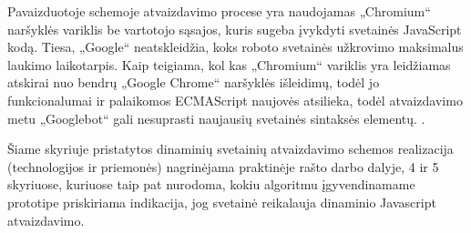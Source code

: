 

Pavaizduotoje schemoje atvaizdavimo procese yra naudojamas „Chromium“ naršyklės variklis be vartotojo sąsajos, kuris sugeba įvykdyti svetainės JavaScript kodą. Tiesa, „Google“ neatskleidžia, koks roboto svetainės užkrovimo maksimalus laukimo laikotarpis. Kaip teigiama, kol kas „Chromium“ variklis yra leidžiamas atskirai nuo bendrų „Google Chrome“ naršyklės išleidimų, todėl jo funkcionalumai ir palaikomos ECMAScript naujovės atsilieka, todėl atvaizdavimo metu „Googlebot“ gali nesuprasti naujausių svetainės sintaksės elementų. \cite{GooglebotCrawling}.

Šiame skyriuje pristatytos dinaminių svetainių atvaizdavimo schemos realizacija (technologijos ir priemonės) nagrinėjama praktinėje rašto darbo dalyje, 4 ir 5 skyriuose, kuriuose taip pat nurodoma, kokiu algoritmu įgyvendinamame prototipe priskiriama indikacija, jog svetainė reikalauja dinaminio Javascript atvaizdavimo.